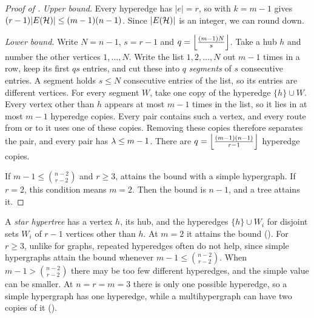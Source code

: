 \begin{proof}[Proof of ]
\emph{Upper bound.} Every hyperedge has $|e| = r$, so  with $k = m-1$ gives $(r-1)|E(\mathcal{H})| \le (m-1)(n-1)$.
Since $|E(\mathcal{H})|$ is an integer, we can round down.

\emph{Lower bound.} Write $N = n-1$, $s = r-1$ and $q = \left\lfloor \frac{(m-1)N}{s} \right\rfloor$.
Take a hub $h$ and number the other vertices $1, \dots, N$.
Write the list $1, 2, \dots, N$ out $m-1$ times in a row, keep its first $qs$ entries, and cut these into $q$ \emph{segments} of $s$ consecutive entries.
A segment holds $s \le N$ consecutive entries of the list, so its entries are different vertices.
For every segment $W$, take one copy of the hyperedge $\{h\} \cup W$.
Every vertex other than $h$ appears at most $m-1$ times in the list, so it lies in at most $m-1$ hyperedge copies.
Every pair contains such a vertex, and every route from or to it uses one of these copies.
Removing these copies therefore separates the pair, and every pair has $\lambda\le m-1$.
There are $q = \left\lfloor \frac{(m-1)(n-1)}{r-1} \right\rfloor$ hyperedge copies.

If $m-1 \le \binom{n-2}{r-2}$ and $r\ge3$,  attains the bound with a simple hypergraph.
If $r = 2$, this condition means $m = 2$. Then the bound is $n-1$, and a tree attains it.
\end{proof}

A \emph{star hypertree} has a vertex $h$, its hub, and the hyperedges $\{h\} \cup W_i$ for disjoint sets $W_i$ of $r-1$ vertices other than $h$. At $m=2$ it attains the bound ().
For $r\ge3$, unlike for graphs, repeated hyperedges often do not help, since simple hypergraphs attain the bound whenever $m-1\le\binom{n-2}{r-2}$.
When $m-1>\binom{n-2}{r-2}$ there may be too few different hyperedges, and the simple value can be smaller.
At $n=r=m=3$ there is only one possible hyperedge, so a simple hypergraph has one hyperedge, while a multihypergraph can have two copies of it ().

